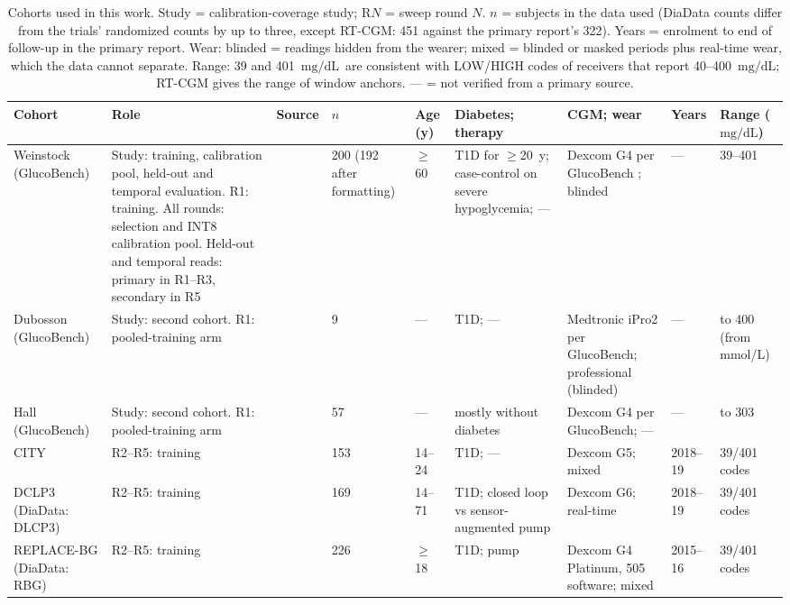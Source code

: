 \documentclass[10pt,twocolumn]{article}
\newcommand{\mgdl}{\ensuremath{\mathrm{mg/dL}}}
\begin{document}
\begin{table}[!tp]
\centering
\caption{Cohorts used in this work. Study = calibration-coverage study;
R$N$ = sweep round $N$. $n$ = subjects in the data used (DiaData counts
differ from the trials' randomized counts by up to three, except RT-CGM:
451 against the primary report's 322). Years =
enrolment to end of follow-up in the primary report. Wear: blinded =
readings hidden from the wearer; mixed = blinded or masked periods plus
real-time wear, which the data cannot separate. Range: 39 and
401~\mgdl\ are consistent with LOW/HIGH codes of receivers that report
40--400~\mgdl; RT-CGM gives the range of window anchors. --- = not
verified from a primary source.}
\label{tab:cohorts}
\raggedcells
\footnotesize
\setlength{\tabcolsep}{3pt}
\begin{tabular}{@{}p{1.55cm}p{3.05cm}p{1.15cm}p{1.1cm}p{0.95cm}p{2.4cm}p{3.35cm}p{1.0cm}p{1.5cm}@{}}
\toprule
Cohort & Role & Source & $n$ & Age (y) & Diabetes; therapy & CGM; wear & Years & Range (\mgdl) \\
\midrule
Weinstock (Glu\-co\-Bench) & Study: training, calibration pool, held-out and temporal evaluation. R1: training. All rounds: selection and INT8 calibration pool. Held-out and temporal reads: primary in R1--R3, secondary in R5 & \cite{weinstock2016risk} & 200 (192 after formatting) & $\geq$60 & T1D for $\geq$20~y; case-control on severe hypoglycemia; --- & Dexcom G4 per GlucoBench \cite{sergazinov2024glucobench}; blinded & --- & 39--401 \\
Dubosson (Glu\-co\-Bench) & Study: second cohort. R1: pooled-training arm & \cite{dubosson2018d1namo} & 9 & --- & T1D; --- & Medtronic iPro2 per GlucoBench; professional (blinded) & --- & to 400 (from mmol/L) \\
Hall (Glu\-co\-Bench) & Study: second cohort. R1: pooled-training arm & \cite{hall2018glucotypes} & 57 & --- & mostly without diabetes & Dexcom G4 per GlucoBench; --- & --- & to 303 \\
CITY & R2--R5: training & \cite{laffel2020city} & 153 & 14--24 & T1D; --- & Dexcom G5; mixed & 2018--19 & 39/401 codes \\
DCLP3 (DiaData: DLCP3) & R2--R5: training & \cite{brown2019closedloop} & 169 & 14--71 & T1D; closed loop vs sensor-augmented pump & Dexcom G6; real-time & 2018--19 & 39/401 codes \\
REPLACE-BG (DiaData: RBG) & R2--R5: training & \cite{aleppo2017replacebg} & 226 & $\geq$18 & T1D; pump & Dexcom G4 Platinum, 505 software; mixed & 2015--16 & 39/401 codes \\

\end{tabular}
\end{table}
\end{document}
